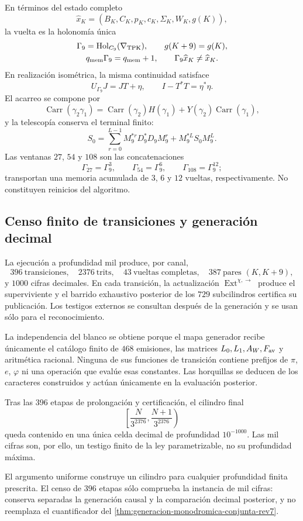 En términos del estado completo
\[
 \widehat x_K=(B_K,C_K,p_K,c_K,\Sigma_K,W_K,g(K)),
\]
la vuelta es la holonomía única
\[
 \begin{gathered}
 \Gamma_9=\operatorname{Hol}_{C_9}(\nabla_{\rm TPK}),
 \qquad g(K+9)=g(K),\\
 q_{\rm mem}\Gamma_9=q_{\rm mem}+1,
 \qquad \Gamma_9\widehat x_K\ne\widehat x_K.
 \end{gathered}
\]
En realización isométrica, la misma continuidad satisface
\[
 U_{\Gamma_9}J=JT+\eta,\qquad
 I-T^*T=\eta^*\eta.
\]
El acarreo se compone por
\[
 \operatorname{Carr}(\gamma_2\gamma_1)
 =\operatorname{Carr}(\gamma_2)H(\gamma_1)
 +Y(\gamma_2)\operatorname{Carr}(\gamma_1),
\]
y la telescopía conserva el terminal finito:
\[
 S_0=\sum_{r=0}^{L-1}M_9^{*r}D_9^*D_9M_9^r
     +M_9^{*L}S_0M_9^L.
\]
Las ventanas \(27\), \(54\) y \(108\) son las concatenaciones
\[
 \Gamma_{27}=\Gamma_9^3,\qquad
 \Gamma_{54}=\Gamma_9^6,\qquad
 \Gamma_{108}=\Gamma_9^{12};
\]
transportan una memoria acumulada de \(3\), \(6\) y \(12\) vueltas,
respectivamente. No constituyen reinicios del algoritmo.

\subsection{Censo finito de transiciones y generación decimal}

La ejecución a profundidad mil produce, por canal,
\[
396\ \text{transiciones},\quad
2376\ \text{trits},\quad
43\ \text{vueltas completas},\quad
387\ \text{pares }(K,K+9),
\]
y \(1000\) cifras decimales. En cada transición, la actualización
\(\operatorname{Ext}^{\chi,\rightarrow}\) produce el superviviente y el
barrido exhaustivo posterior de los \(729\) subcilindros certifica su
publicación. Los testigos externos se consultan después de la generación y se
usan sólo para el reconocimiento.

La independencia del blanco se obtiene porque el mapa generador recibe
únicamente el catálogo finito de \(468\) emisiones, las matrices
\(L_0,L_1,A_W,F_{\rm av}\) y aritmética racional. Ninguna de sus funciones
de transición contiene prefijos de \(\pi\), \(e\), \(\varphi\) ni una
operación que evalúe esas constantes. Las horquillas se deducen de los
caracteres construidos y actúan únicamente en la evaluación posterior.

Tras las 396 etapas de prolongación y certificación, el cilindro final
\[
 \left[\frac{N}{3^{2376}},\frac{N+1}{3^{2376}}\right)
\]
queda contenido en una única celda decimal de profundidad \(10^{-1000}\).
Las mil cifras son, por ello, un testigo finito de la ley parametrizable, no
su profundidad máxima.

El argumento uniforme construye un cilindro para cualquier profundidad
finita prescrita. El censo de \(396\) etapas sólo comprueba la instancia de
mil cifras: conserva separadas la generación causal y la comparación decimal
posterior, y no reemplaza el cuantificador del
\cref{thm:generacion-monodromica-conjunta-rev7}.
